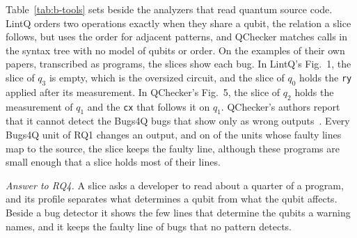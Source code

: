 Table~\ref{tab:b-tools} sets \tool{} beside the analyzers that read quantum source code. LintQ orders two operations
exactly when they share a qubit, the relation a slice follows, but uses the order for adjacent patterns, and QChecker
matches calls in the syntax tree with no model of qubits or order. On the examples of their own papers, transcribed as
programs, the slices show each bug. In LintQ's Fig.~1, the slice of $q_3$ is empty, which is the oversized circuit,
and the slice of $q_0$ holds the \texttt{ry} applied after its measurement. In QChecker's Fig.~5, the slice of $q_2$
holds the measurement of $q_1$ and the \texttt{cx} that follows it on $q_1$. QChecker's authors report that it cannot
detect the Bugs4Q bugs that show only as wrong outputs~\cite{zhao2023qchecker}. Every Bugs4Q unit of RQ1 changes an
output, and on \numLinesLcContained{} of the \numLinesUnits{} units whose faulty lines map to the source, the slice keeps
the faulty line, although these programs are small enough that a slice holds most of their lines.

\emph{Answer to RQ4.} A slice asks a developer to read about a quarter of a program, and its profile separates what
determines a qubit from what the qubit affects. Beside a bug detector it shows the few lines that determine the qubits a
warning names, and it keeps the faulty line of bugs that no pattern detects.
